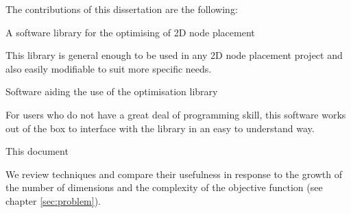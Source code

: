 		The contributions of this dissertation are the following:
		
		\begin{description}	
		
			\item A software library for the optimising of 2D node placement
			
			This library is general enough to be used in any 2D node placement project and also easily modifiable to suit more specific needs.
			
			\item Software aiding the use of the optimisation library
			
			For users who do not have a great deal of programming skill, this software works out of the box to interface with the library in an easy to understand way.
			
			\item This document
						
			We review techniques and compare their usefulness in response to the growth of the number of dimensions and the complexity of the objective function (see chapter \ref{sec:problem}).
			
		\end{description}
